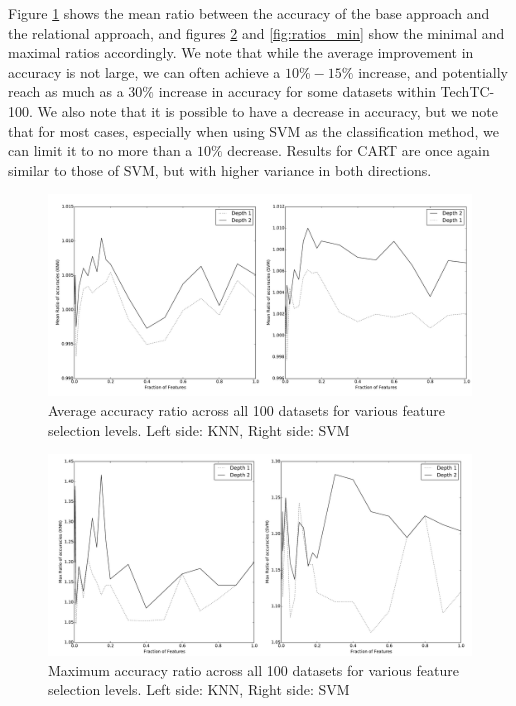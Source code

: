 \documentclass{article}
\theoremstyle{definition}
\begin{document}
Figure \ref{fig:ratios} shows the mean ratio between the accuracy of the base approach and the relational approach, and figures \ref{fig:ratios_max} and \ref{fig:ratios_min} show the minimal and maximal ratios accordingly. We note that while the average improvement in accuracy is not large, we can often achieve a $10\%-15\%$ increase, and potentially reach as much as a $30\%$ increase in accuracy for some datasets within TechTC-100. We also note that it is possible to have a decrease in accuracy, but we note that for most cases, especially when using SVM as the classification method, we can limit it to no more than a $10\%$ decrease. Results for CART are once again similar to those of SVM, but with higher variance in both directions.

\begin{figure}[H]
	\centering
	\includegraphics[width=\linewidth]{ratios.pdf}
	\caption{Average accuracy ratio across all 100 datasets for various feature selection levels. Left side: KNN, Right side: SVM}
	\label{fig:ratios}
\end{figure}

\begin{figure}[H]
	\centering
	\includegraphics[width=\linewidth]{ratios_max.pdf}
	\caption{Maximum accuracy ratio across all 100 datasets for various feature selection levels. Left side: KNN, Right side: SVM}
	\label{fig:ratios_max}
\end{figure}
\end{document}
